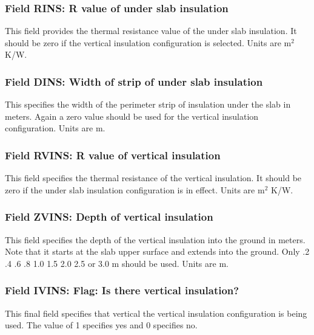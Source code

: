 \subsubsection{Field RINS: R value of under slab insulation}\label{field-rins-r-value-of-under-slab-insulation}

This field provides the thermal resistance value of the under slab insulation. It should be zero if the vertical insulation configuration is selected. Units are m\(^{2}\) K/W.

\subsubsection{Field DINS: Width of strip of under slab insulation}\label{field-dins-width-of-strip-of-under-slab-insulation}

This specifies the width of the perimeter strip of insulation under the slab in meters. Again a zero value should be used for the vertical insulation configuration. Units are m.

\subsubsection{Field RVINS: R value of vertical insulation}\label{field-rvins-r-value-of-vertical-insulation}

This field specifies the thermal resistance of the vertical insulation. It should be zero if the under slab insulation configuration is in effect. Units are m\(^{2}\) K/W.

\subsubsection{Field ZVINS: Depth of vertical insulation}\label{field-zvins-depth-of-vertical-insulation}

This field specifies the depth of the vertical insulation into the ground in meters. Note that it starts at the slab upper surface and extends into the ground. Only .2 .4 .6 .8 1.0 1.5 2.0 2.5 or 3.0 m should be used. Units are m.

\subsubsection{Field IVINS: Flag: Is there vertical insulation?}\label{field-ivins-flag-is-there-vertical-insulation}

This final field specifies that vertical the vertical insulation configuration is being used. The value of 1 specifies yes and 0 specifies no.

